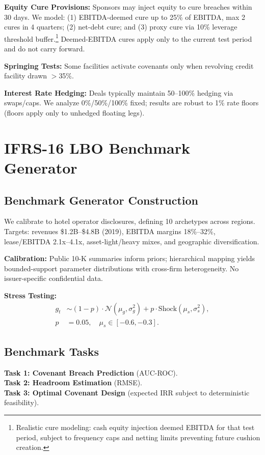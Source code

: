 \documentclass[11pt,a4paper]{article}
\theoremstyle{plain}
\theoremstyle{definition}
\begin{document}
\textbf{Equity Cure Provisions:} Sponsors may inject equity to cure breaches within 30 days. We model: (1) EBITDA-deemed cure up to 25\% of EBITDA, max 2 cures in 4 quarters; (2) net-debt cure; and (3) proxy cure via 10\% leverage threshold buffer.\footnote{Realistic cure modeling: cash equity injection deemed EBITDA for that test period, subject to frequency caps and netting limits preventing future cushion creation.} Deemed-EBITDA cures apply only to the current test period and do not carry forward.

\textbf{Springing Tests:} Some facilities activate covenants only when revolving credit facility drawn $>$35\%.

\textbf{Interest Rate Hedging:} Deals typically maintain 50--100\% hedging via swaps/caps. We analyze 0\%/50\%/100\% fixed; results are robust to 1\% rate floors (floors apply only to unhedged floating legs).

\section{IFRS-16 LBO Benchmark Generator}

\subsection{Benchmark Generator Construction}

We calibrate to hotel operator disclosures, defining 10 archetypes across regions. Targets: revenues \$1.2B--\$4.8B (2019), EBITDA margins 18\%--32\%, lease/EBITDA 2.1x--4.1x, asset-light/heavy mixes, and geographic diversification.

\textbf{Calibration:} Public 10-K summaries inform priors; hierarchical mapping yields bounded-support parameter distributions with cross-firm heterogeneity. No issuer-specific confidential data.

\textbf{Stress Testing:}
\begin{align}
g_t &\sim (1-p)\cdot \mathcal{N}(\mu_g,\sigma_g^2) + p\cdot \text{Shock}(\mu_s,\sigma_s^2), \\
p&=0.05,\quad \mu_s\in[-0.6,-0.3].
\end{align}

\subsection{Benchmark Tasks}

\textbf{Task 1: Covenant Breach Prediction} (AUC-ROC). \\
\textbf{Task 2: Headroom Estimation} (RMSE). \\
\textbf{Task 3: Optimal Covenant Design} (expected IRR subject to deterministic feasibility).
\end{document}
